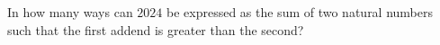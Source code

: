In how many ways can $2024$ be expressed as the sum of two natural numbers such that the first addend is greater than the second?
